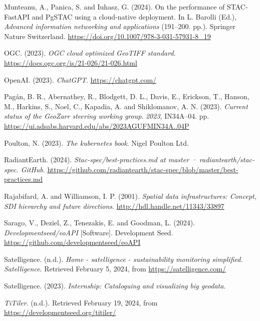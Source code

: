 \documentclass[
  oneside,
  open=any]{scrbook}
\newlength{\cslhangindent}
\newenvironment{CSLReferences}[2] %
 {\begin{list}{}{%
  \setlength{\itemindent}{0pt}
  \setlength{\leftmargin}{0pt}
  \setlength{\parsep}{0pt}
  \ifodd #1
   \setlength{\leftmargin}{\cslhangindent}
   \setlength{\itemindent}{-1\cslhangindent}
  \fi
  \setlength{\itemsep}{#2\baselineskip}}}
 {\end{list}}
\begin{document}
\begin{CSLReferences}{1}{0}
Munteanu, A., Panica, S. and Iuhasz, G. (2024). On the performance of
{STAC}-{FastAPI} and {PgSTAC} using a cloud-native deployment. In L.
Barolli (Ed.), \emph{Advanced information networking and applications}
(191--200. pp.). Springer Nature Switzerland.
\url{https://doi.org/10.1007/978-3-031-57931-8_19}

OGC. (2023). \emph{{OGC} cloud optimized {GeoTIFF} standard}.
\url{https://docs.ogc.org/is/21-026/21-026.html}

OpenAI. (2023). \emph{{ChatGPT}}. \url{https://chatgpt.com/}

Pagán, B. R., Abernathey, R., Blodgett, D. L., Davis, E., Erickson, T.,
Hanson, M., Harkins, S., Noel, C., Kapadia, A. and Shiklomanov, A. N.
(2023). \emph{Current status of the {GeoZarr} steering working group}.
\emph{2023}, IN34A--04. pp.
\url{https://ui.adsabs.harvard.edu/abs/2023AGUFMIN34A..04P}

Poulton, N. (2023). \emph{The kubernetes book}. Nigel Poulton Ltd.

RadiantEarth. (2024). \emph{Stac-spec/best-practices.md at master ·
radiantearth/stac-spec. {GitHub}}.
\url{https://github.com/radiantearth/stac-spec/blob/master/best-practices.md}

Rajabifard, A. and Williamson, I. P. (2001). \emph{Spatial data
infrastructures: Concept, {SDI} hierarchy and future directions}.
\url{http://hdl.handle.net/11343/33897}

Sarago, V., Deziel, Z., Tenezakis, E. and Goodman, L. (2024).
\emph{Developmentseed/{eoAPI}} {[}Software{]}. Development Seed.
\url{https://github.com/developmentseed/eoAPI}

Satelligence. (n.d.). \emph{Home - satelligence - sustainability
monitoring simplified. Satelligence}. Retrieved February 5, 2024, from
\url{https://satelligence.com/}

Satelligence. (2023). \emph{Internship: Cataloguing and visualizing big
geodata}.

\emph{{TiTiler}}. (n.d.). Retrieved February 19, 2024, from
\url{https://developmentseed.org/titiler/}


\end{CSLReferences}
\end{document}
